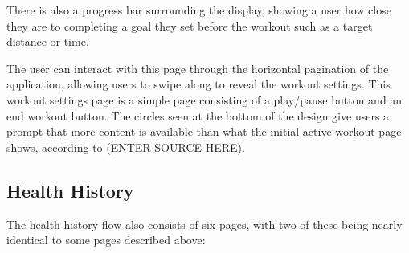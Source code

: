 \documentclass{l4proj}
\begin{document}
There is also a progress bar surrounding the display, showing a user how close they are to completing a goal they set before the workout such as a target distance or time.

The user can interact with this page through the horizontal pagination of the application, allowing users to swipe along to reveal the workout settings. This workout settings page is a simple page consisting of a play/pause button and an end workout button. The circles seen at the bottom of the design give users a prompt that more content is available than what the initial active workout page shows, according to (ENTER SOURCE HERE). 

\subsection{Health History}

The health history flow also consists of six pages, with two of these being nearly identical to some pages described above:
\end{document}
